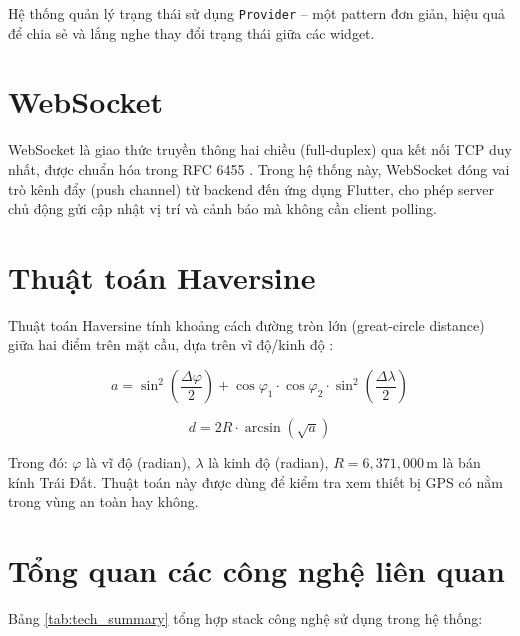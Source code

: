 Hệ thống quản lý trạng thái sử dụng \texttt{Provider} -- một pattern đơn giản, hiệu quả để chia sẻ và lắng nghe thay đổi trạng thái giữa các widget.

\section{WebSocket}

WebSocket là giao thức truyền thông hai chiều (full-duplex) qua kết nối TCP duy nhất, được chuẩn hóa trong RFC 6455 \cite{fette2011websocket}. Trong hệ thống này, WebSocket đóng vai trò kênh đẩy (push channel) từ backend đến ứng dụng Flutter, cho phép server chủ động gửi cập nhật vị trí và cảnh báo mà không cần client polling.

\section{Thuật toán Haversine}

Thuật toán Haversine tính khoảng cách đường tròn lớn (great-circle distance) giữa hai điểm trên mặt cầu, dựa trên vĩ độ/kinh độ \cite{sinnott1984virtues}:

\begin{equation}
  a = \sin^2\!\left(\frac{\Delta\varphi}{2}\right) + \cos\varphi_1 \cdot \cos\varphi_2 \cdot \sin^2\!\left(\frac{\Delta\lambda}{2}\right)
  \label{eq:haversine_a}
\end{equation}

\begin{equation}
  d = 2R \cdot \arcsin\!\left(\sqrt{a}\right)
  \label{eq:haversine_d}
\end{equation}

Trong đó: $\varphi$ là vĩ độ (radian), $\lambda$ là kinh độ (radian), $R = 6{,}371{,}000$\,m là bán kính Trái Đất. Thuật toán này được dùng để kiểm tra xem thiết bị GPS có nằm trong vùng an toàn hay không.

\section{Tổng quan các công nghệ liên quan}

Bảng \ref{tab:tech_summary} tổng hợp stack công nghệ sử dụng trong hệ thống:

